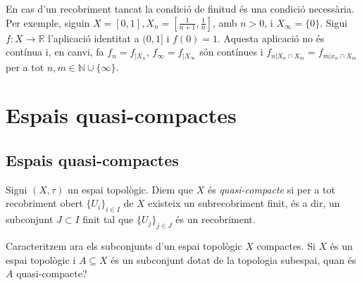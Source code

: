 \documentclass[../main.tex]{subfiles}
\begin{document}
\begin{nota}
En cas d'un recobriment tancat la condició de finitud és una condició necessària. Per exemple, siguin $X = [0,1], X_n = \left[\frac{1}{n+1},\frac{1}{n}\right]$, amb $n>0$, i $X_\infty = \{0\}$. Sigui $f:X\rightarrow\mathbb{R}$ l'aplicació identitat a $(0,1]$ i $f(0) = 1$. Aquesta aplicació no és contínua i, en canvi, fa $f_n = f_{|X_n}$, $f_\infty = f_{|X_\infty}$ són contínues i $f_{n|X_n\cap X_m} = f_{m|x_n\cap X_m}$ per a tot $n,m\in\mathbb{N}\cup\{\infty\}$.
\end{nota}

\section{Espais quasi-compactes}
\subsection{Espais quasi-compactes}

\begin{defi}
\label{def:quasicompacte} Sigui $(X,\tau)$ un espai topològic. Diem que $X$ és \textit{quasi-compacte} si per a tot recobriment obert $\{U_i\}_{i\in I}$ de $X$ existeix un subrecobriment finit, és a dir, un subconjunt $J\subset I$ finit tal que $\{U_j\}_{j\in J}$ és un recobriment.
\end{defi}

Caracteritzem ara els subconjunts d'un espai topològic $X$ compactes. Si $X$ és un espai topològic i $A\subseteq X$ és un subconjunt dotat de la topologia subespai, quan és $A$ quasi-compacte?
\end{document}
